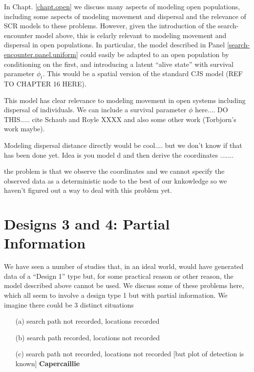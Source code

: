 In Chapt. \ref{chapt.open} we discuss many aspects of modeling open
populations, including some aspects of modeling movement and dispersal
and the relevance of SCR models to these problems. However, given the
introduction of the search-encounter model above, this is celarly
relevant to modeling movement and dispersal in open populations.
In particular, the model described in Panel
\ref{search-encounter.panel.uniform} could easily be adapted to an
open population by conditioning on the first, and introducing a latent
``alive state'' with survival parameter $\phi_{t}$. This would be a
spatial version of the standard CJS model (REF TO CHAPTER 16 HERE).

This model has clear relevance to modeling movement in open systems
including dispersal of individuals. We can include a survival
parameter $\phi$ here.... DO THIS..... cite Schaub and Royle XXXX and
also some other work (Torbjorn's work maybe).

Modeling dispersal distance directly would be cool.... but we don't
know if that has been done yet.
Idea is you model d and then derive the coordinates .......

the problem is that we observe the coordinates and we cannot specify
the observed data as a deterministic node to the best of our
knkowledge so we haven't figured out a way to deal with this problem
yet.



\section{Designs 3 and 4: Partial Information}

We have seen a number of studies that, in an ideal world, would have
generated data of a ``Design
1'' type but, for some practical reason or other reason, the model described
above cannot be used.
 We discuss some of these problems here, which all seem to involve a
 design type 1 but with partial information. We imagine there could be
 3 distinct situations
\begin{itemize}
\item[(a)] search path not recorded, locations recorded
\item[(b)] search path recorded, locations not recorded
\item[(c)] search path not recorded, locations not recorded [but plot of
detection is known]  {\bf Capercaillie}
\end{itemize}

